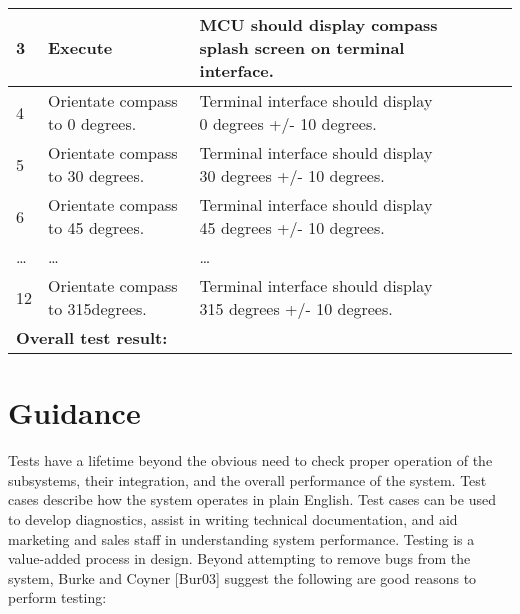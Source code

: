 \begin{table}[h]
\begin{tabular}{|m{1cm}|m{2cm}|m{2cm}|m{1cm}|m{1cm}|m{1cm}|m{2cm}|m{2cm}|}
3 & Execute & MCU should display compass splash screen on terminal
interface. & & & & \multicolumn{2}{l}{}\\ \hline

4 & Orientate compass to 0 degrees. & Terminal interface should display
0 degrees +/- 10 degrees. & & & & \multicolumn{2}{l}{}\\ \hline

5 & Orientate compass to 30 degrees. & Terminal interface should display
30 degrees +/- 10 degrees. & & & & \multicolumn{2}{l}{}\\ \hline

6 & Orientate compass to 45 degrees. & Terminal interface should display
45 degrees +/- 10 degrees. & & & & \multicolumn{2}{l}{}\\ \hline

\ldots{} & \ldots{} & \ldots{} & & & &  \multicolumn{2}{l}{}\\ \hline

12 & Orientate compass to 315degrees. & Terminal interface should
display 315 degrees +/- 10 degrees. & & & & \multicolumn{2}{l}{}\\ \hline
\multicolumn{3}{l}{\textbf{Overall test result:}} &   &  &  &  \multicolumn{2}{l}{}\\ \hline
\end{tabular}
\end{table}

\section{Guidance}
\label{section:guidance}

Tests have a lifetime beyond the obvious need to check proper operation
of the subsystems, their integration, and the overall performance of the
system. Test cases describe how the system operates in plain English.
Test cases can be used to develop diagnostics, assist in writing
technical documentation, and aid marketing and sales staff in
understanding system performance. Testing is a value-added process in
design. Beyond attempting to remove bugs from the system, Burke and
Coyner {[}Bur03{]} suggest the following are good reasons to perform
testing:

